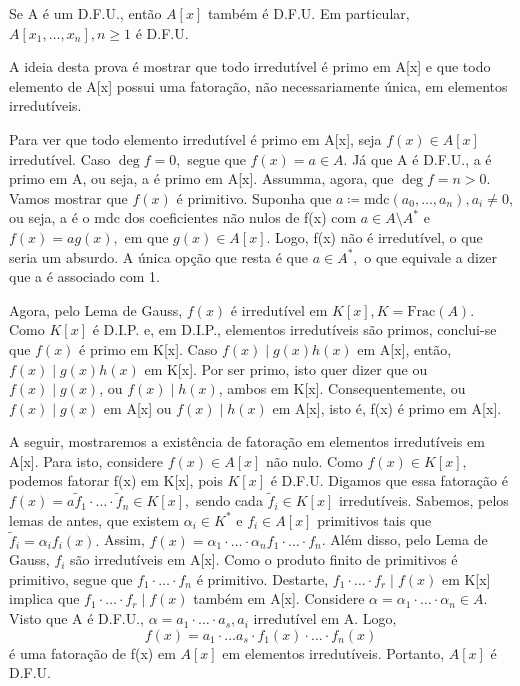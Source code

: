 \documentclass[algebraII_notes.tex]{subfiles}
\begin{document}
\begin{theorem*}
	Se A é um D.F.U., então \(A[x]\) também é D.F.U. Em particular, \(A[x_{1}, \dotsc , x_{n}], n\geq 1\) é D.F.U.
\end{theorem*}
\begin{proof*}
	A ideia desta prova é mostrar que todo irredutível é primo em A[x] e que todo elemento de A[x] possui uma fatoração, não necessariamente
	única, em elementos irredutíveis.

	Para ver que todo elemento irredutível é primo em A[x], seja \(f(x)\in A[x]\) irredutível. Caso \(\deg{f} = 0,\) segue que \(f(x) = a\in A.\) Já
	que A é D.F.U., a é primo em A, ou seja, a é primo em A[x]. Assumma, agora, que \(\deg{f} = n > 0.\) Vamos mostrar que \(f(x)\) é primitivo. Suponha que
	\(a\coloneqq \mathrm{mdc}(a_{0}, \dotsc , a_{n}), a_{i}\neq 0\), ou seja, a é o mdc dos coeficientes não nulos de f(x) com \(a\in A\setminus{A^{*}} \) e
	\(f(x) = ag(x),\) em que \(g(x)\in A[x].\) Logo, f(x) não é irredutível, o que seria um absurdo. A única opção que resta é que \(a\in A^{*},\) o que equivale a dizer
	que a é associado com 1.

	Agora, pelo Lema de Gauss, \(f(x)\) é irredutível em \(K[x], K = \mathrm{Frac}(A).\) Como \(K[x]\) é D.I.P. e, em D.I.P., elementos irredutíveis são primos,
	conclui-se que \(f(x)\) é primo em K[x]. Caso \(f(x)\mid g(x)h(x)\) em A[x], então, \(f(x)\mid g(x)h(x)\) em K[x]. Por ser primo, isto quer dizer que ou
	\(f(x)\mid g(x)\), ou \(f(x)\mid h(x)\), ambos em K[x]. Consequentemente, ou \(f(x)\mid g(x)\) em A[x] ou \(f(x)\mid h(x)\) em A[x], isto é, f(x) é primo em A[x].

	A seguir, mostraremos a existência de fatoração em elementos irredutíveis em A[x]. Para isto, considere \(f(x)\in A[x]\) não nulo. Como \(f(x)\in K[x],\)
	podemos fatorar f(x) em K[x], pois \(K[x]\) é D.F.U. Digamos que essa fatoração é \(f(x) = a\tilde{f}_{1}\cdot \dotsc \cdot \tilde{f}_{n}\in K[x],\) sendo cada
	\(\tilde{f}_{i}\in K[x]\) irredutíveis. Sabemos, pelos lemas de antes, que existem \(\alpha_{i}\in K^{*}\) e \(f_{i}\in A[x]\) primitivos tais que \(\tilde{f}_{i} =
	\alpha_{i}f_{i}(x).\) Assim, \(f(x) = \alpha_{1}\cdot \dotsc \cdot \alpha_{n}f_{1}\cdot \dotsc \cdot f_{n}\). Além disso, pelo Lema de Gauss, \(f_{i}\) são irredutíveis
	em A[x]. Como o produto finito de primitivos é primitivo, segue que \(f_{1}\cdot \dotsc \cdot f_{n}\) é primitivo. Destarte, \(f_{1}\cdot \dotsc \cdot f_{r}\mid f(x)\)
	em K[x] implica que \(f_{1}\cdot \dotsc \cdot f_{r}\mid f(x)\) também em A[x]. Considere \(\alpha = \alpha _{1}\cdot \dotsc \cdot \alpha_{n}\in A.\) Visto que A é
	D.F.U., \(\alpha = a_{1}\cdot \dotsc \cdot a_{s}, a_{i}\) irredutível em A. Logo,
	\[
		f(x) = a_{1}\cdot \dotsc a_{s}\cdot f_{1}(x)\cdot \dotsc \cdot f_{n}(x)
	\]
	é uma fatoração de f(x) em \(A[x]\) em elementos irredutíveis. Portanto, \(A[x]\) é D.F.U. \qedsymbol
\end{proof*}
\end{document}

